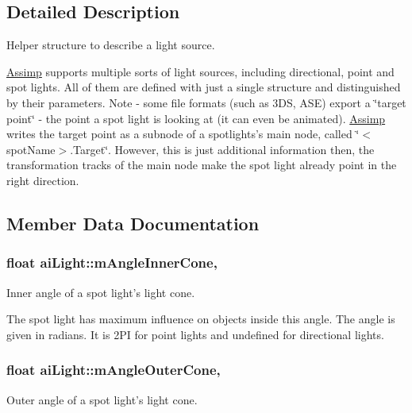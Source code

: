 \subsection{Detailed Description}
Helper structure to describe a light source.

\hyperlink{class_assimp}{Assimp} supports multiple sorts of light sources, including directional, point and spot lights. All of them are defined with just a single structure and distinguished by their parameters. Note -\/ some file formats (such as 3\+D\+S, A\+S\+E) export a \char`\"{}target point\char`\"{} -\/ the point a spot light is looking at (it can even be animated). \hyperlink{class_assimp}{Assimp} writes the target point as a subnode of a spotlights's main node, called \char`\"{}$<$spot\+Name$>$.\+Target\char`\"{}. However, this is just additional information then, the transformation tracks of the main node make the spot light already point in the right direction. 

\subsection{Member Data Documentation}
\hypertarget{structai_light_abad0466811938623e98bf1d334143f9a}{
\subsubsection[{m\+Angle\+Inner\+Cone}]{\setlength{\rightskip}{0pt plus 5cm}float ai\+Light\+::m\+Angle\+Inner\+Cone\hspace{0.3cm}{\ttfamily [get]}, {\ttfamily [set]}}}\label{structai_light_abad0466811938623e98bf1d334143f9a}
Inner angle of a spot light's light cone.

The spot light has maximum influence on objects inside this angle. The angle is given in radians. It is 2\+P\+I for point lights and undefined for directional lights. \hypertarget{structai_light_a20fd332a5f9d8e8cb94816ff2b0ae7f4}{
\subsubsection[{m\+Angle\+Outer\+Cone}]{\setlength{\rightskip}{0pt plus 5cm}float ai\+Light\+::m\+Angle\+Outer\+Cone\hspace{0.3cm}{\ttfamily [get]}, {\ttfamily [set]}}}\label{structai_light_a20fd332a5f9d8e8cb94816ff2b0ae7f4}
Outer angle of a spot light's light cone.

